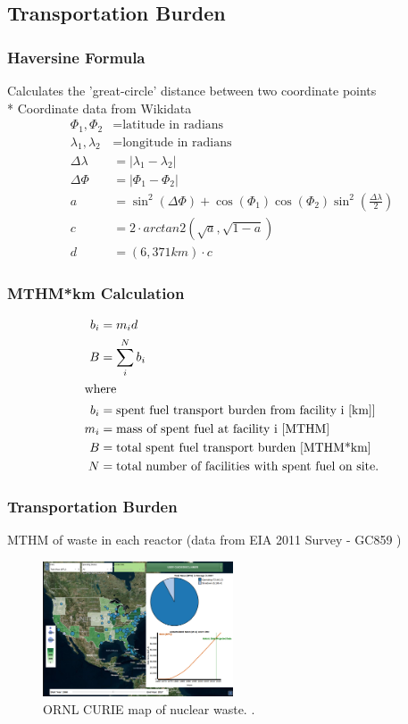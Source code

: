 \subsection{Transportation Burden}

\begin{frame}
	\frametitle{Haversine Formula}
	Calculates the 'great-circle' distance between two coordinate points\\
	* Coordinate data from Wikidata
	\begin{align} 
	\Phi_1,\Phi_2&= \mbox{latitude in radians}\\
	\lambda_1,\lambda_2 &= \mbox{longitude in radians}\\
	\Delta\lambda &= \left|\lambda_1 - \lambda_2\right|\\
	\Delta\Phi &= \left|\Phi_1 - \Phi_2\right|\\
	a&=\sin^2(\Delta\Phi)+\cos(\Phi_1)\cos(\Phi_2)\sin^2{\left(\frac{\Delta\lambda}{2}\right)}\\
	c &= 2 \cdot arctan2(\sqrt{a},\sqrt{1-a})\\
	d &=  (6,371km) \cdot c
	\end{align}
	
\end{frame}

\begin{frame}
	\frametitle{MTHM*km Calculation}
	\begin{align}
	b_i &= m_id\\
	B &= \sum_i^N b_i\\
	\intertext{where}
	b_i &= \mbox{spent fuel transport burden from facility i [km]]}\\
	m_i &= \mbox{mass of spent fuel at facility i [MTHM]}\\
	B &= \mbox{total spent fuel transport burden [MTHM*km]}\\
	N &= \mbox{total number of facilities with spent fuel on site.}
	\end{align}
\end{frame}

\begin{frame}
	\frametitle{Transportation Burden}
	MTHM of waste in each reactor (data from EIA 2011 Survey - GC859 \cite{domenico_gc-859_2016})
	\begin{figure}[htbp!]
		\begin{center}
			\includegraphics[height=4cm]{./images/curie_map}
		\end{center}
		\caption{ORNL CURIE map of nuclear waste. \cite{ornl_centralized_2016}.}
		\label{fig:curie_map}
	\end{figure}

\end{frame}

